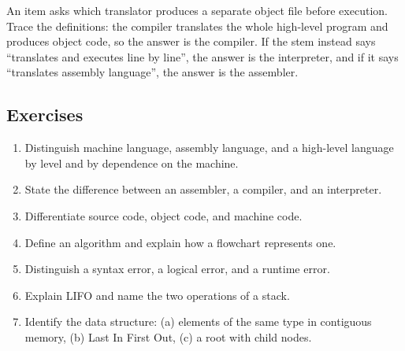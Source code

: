 \begin{example}
An item asks which translator produces a separate object file before
execution. Trace the definitions: the compiler translates the whole
high-level program and produces object code, so the answer is the compiler. If
the stem instead says ``translates and executes line by line'', the answer is
the interpreter, and if it says ``translates assembly language'', the answer
is the assembler.
\end{example}

\subsection*{Exercises}
\begin{enumerate}[label=\arabic*.]
  \item Distinguish machine language, assembly language, and a high-level
    language by level and by dependence on the machine.
  \item State the difference between an assembler, a compiler, and an
    interpreter.
  \item Differentiate source code, object code, and machine code.
  \item Define an algorithm and explain how a flowchart represents one.
  \item Distinguish a syntax error, a logical error, and a runtime error.
  \item Explain LIFO and name the two operations of a stack.
  \item Identify the data structure: (a) elements of the same type in
    contiguous memory, (b) Last In First Out, (c) a root with child nodes.
\end{enumerate}

